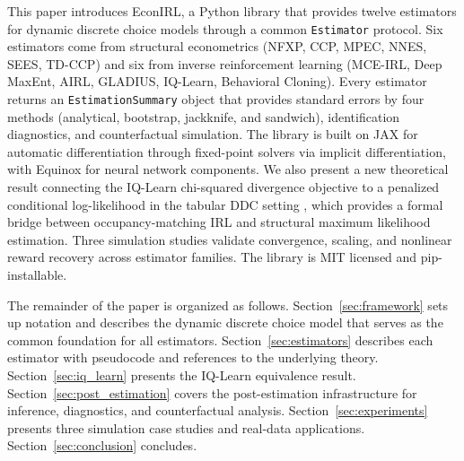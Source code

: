 This paper introduces EconIRL, a Python library that provides twelve estimators for dynamic discrete choice models through a common \texttt{Estimator} protocol. Six estimators come from structural econometrics (NFXP, CCP, MPEC, NNES, SEES, TD-CCP) and six from inverse reinforcement learning (MCE-IRL, Deep MaxEnt, AIRL, GLADIUS, IQ-Learn, Behavioral Cloning). Every estimator returns an \texttt{EstimationSummary} object that provides standard errors by four methods (analytical, bootstrap, jackknife, and sandwich), identification diagnostics, and counterfactual simulation. The library is built on JAX \citep{jax2018} for automatic differentiation through fixed-point solvers via implicit differentiation, with Equinox \citep{kidger2021} for neural network components. We also present a new theoretical result connecting the IQ-Learn chi-squared divergence objective to a penalized conditional log-likelihood in the tabular DDC setting \citep{rawat2026}, which provides a formal bridge between occupancy-matching IRL and structural maximum likelihood estimation. Three simulation studies validate convergence, scaling, and nonlinear reward recovery across estimator families. The library is MIT licensed and pip-installable.

The remainder of the paper is organized as follows. Section~\ref{sec:framework} sets up notation and describes the dynamic discrete choice model that serves as the common foundation for all estimators. Section~\ref{sec:estimators} describes each estimator with pseudocode and references to the underlying theory. Section~\ref{sec:iq_learn} presents the IQ-Learn equivalence result. Section~\ref{sec:post_estimation} covers the post-estimation infrastructure for inference, diagnostics, and counterfactual analysis. Section~\ref{sec:experiments} presents three simulation case studies and real-data applications. Section~\ref{sec:conclusion} concludes.
